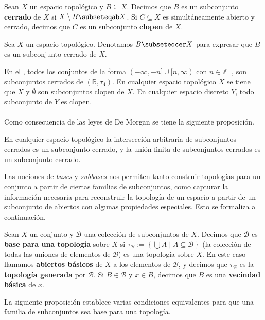 \begin{Def}
   Sean $X$ un espacio topológico y $B\subseteq X$. Decimos que $B$ es un subconjunto \textbf{cerrado} de $X$ si $X\setminus B \subseteqab X$. Si $C\subseteq X$ es simultáneamente abierto y cerrado, decimos que $C$ es un subconjunto \textbf{clopen} de $X$. 
\end{Def}
\begin{Not}
   Sea $X$ un espacio topológico. Denotamos $B\subseteqcer X$ para expresar que $B$ es un subconjunto cerrado de $X$.
\end{Not}
En el , todos los conjuntos de la forma $(-\infty,-n]\cup [n,\infty)$ con $n\in \mathbb{Z}^+$, son subconjuntos cerrados de $(\mathbb{R},\tau_4)$. En cualquier espacio topológico $X$ se tiene que $X$ y $\emptyset$ son subconjuntos clopen de $X$. En cualquier espacio discreto $Y$, todo subconjunto de $Y$ es clopen.\\\\
Como consecuencia de las leyes de De Morgan se tiene la siguiente proposición.
\begin{Prop}
   En cualquier espacio topológico la intersección arbitraria de subconjuntos cerrados es un subconjunto cerrado, y la unión finita de subconjuntos cerrados es un subconjunto cerrado.
\end{Prop}
Las nociones de \textit{bases} y \textit{subbases} nos permiten tanto construir topologías para un conjunto a partir de ciertas familias de subconjuntos, como capturar la información necesaria para reconstruir la topología de un espacio a partir de un subconjunto de abiertos con algunas propiedades especiales. Esto se formaliza a continuación. 
\begin{Def}
   Sean $X$ un conjunto y $\mathcal{B}$ una colección de subconjuntos de $X$. Decimos que $\mathcal{B}$ es \textbf{base para una topología} sobre $X$ si $\tau_\mathcal{B}:=\left\lbrace \bigcup A \mid A\subseteq \mathcal{B}\right\rbrace$ (la colección de todas las uniones de elementos de $\mathcal{B}$) es una topología sobre $X$. En este caso llamamos \textbf{abiertos básicos} de $X$ a los elementos de $\mathcal{B}$, y decimos que $\tau_\mathcal{B}$ es la \textbf{topología generada} por $\mathcal{B}$. Si $B\in\mathcal{B}$ y $x\in B$, decimos que $B$ es una \textbf{vecindad básica} de $x$.
\end{Def}
La siguiente proposición establece varias condiciones equivalentes para que una familia de subconjuntos sea base para una topología.
